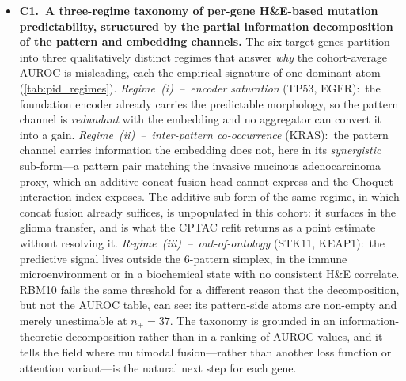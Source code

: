\begin{itemize}
    \item \textbf{C1.\ A three-regime taxonomy of per-gene H\&E-based
    mutation predictability, structured by the partial information
    decomposition of the pattern and embedding channels.}
    The six target genes partition into three qualitatively distinct
    regimes that answer \emph{why} the cohort-average AUROC is
    misleading, each the empirical signature of one dominant \pid{}
    atom
    (\cref{tab:pid_regimes}).\cite{williams2010pid,bertschinger2014unique}
    \emph{Regime~(i)~--~encoder saturation} (TP53, EGFR):\ the
    \ctranspath{} foundation encoder already carries the predictable
    morphology, so the pattern channel is \emph{redundant} with the
    embedding and no aggregator can convert it into a gain.
    \emph{Regime~(ii)~--~inter-pattern co-occurrence} (KRAS):\ the
    pattern channel carries information the embedding does not, here
    in its \emph{synergistic} sub-form---a pattern pair matching the
    invasive mucinous adenocarcinoma proxy, which an additive
    concat-fusion head cannot express and the Choquet interaction
    index exposes. The additive sub-form of the same regime, in which
    concat fusion already suffices, is unpopulated in this cohort: it
    surfaces in the glioma transfer, and is what the CPTAC refit
    returns as a point estimate without resolving it.
    \emph{Regime~(iii)~--~out-of-ontology} (STK11, KEAP1):\ the
    predictive signal lives outside the 6-pattern simplex, in the
    immune microenvironment or in a biochemical state with no
    consistent H\&E correlate.
    RBM10 fails the same threshold for a different reason that the
    decomposition, but not the AUROC table, can see: its
    pattern-side atoms are non-empty and merely unestimable at
    $n_+\!=\!37$.
    The taxonomy is grounded in an information-theoretic
    decomposition rather than in a ranking of AUROC values, and it
    tells the field where multimodal fusion---rather than another
    loss function or attention variant---is the natural next step
    for each gene.


\end{itemize}
